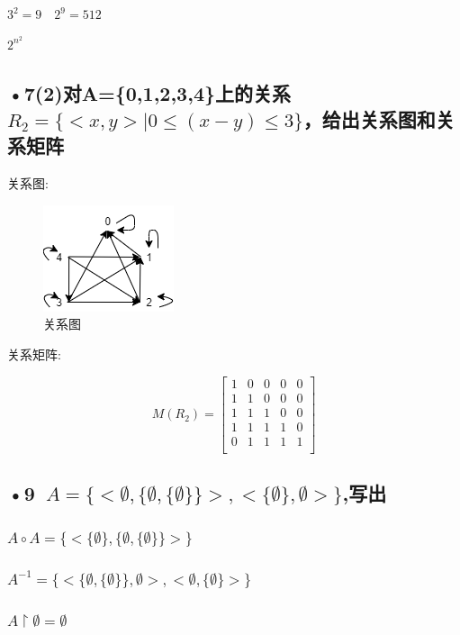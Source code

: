 \documentclass[UTF8]{ctexart}
\begin{document}
$3^2=9\quad 2^9=512$

$2^{n^2}$
\subsection*{•7(2)对A=\{0,1,2,3,4\}上的关系$R_2=\{<x,y>\mid 0\leqslant (x-y)\leqslant 3 \}$，给出关系图和关系矩阵}

关系图:
\begin{figure}[H]
  \centering
  \includegraphics[totalheight=2in]{HW7_4.png}
  \caption{关系图} \label{fig:graph}
\end{figure}

关系矩阵:

\begin{displaymath}
M(R_2)= \left[
\begin{matrix}
   1 & 0 & 0 &0 &0\\
   1 & 1 & 0 &0 &0\\
   1 & 1 & 1 &0 &0\\
   1 & 1 & 1 &1 &0\\
   0 & 1 & 1 &1 &1\\
\end{matrix}
\right] 
\end{displaymath}

\subsection*{•9\ $A=\{<\emptyset ,\{\emptyset , \{\emptyset\}\} >,<\{\emptyset \},\emptyset > \}$,写出}

\subsubsection*{$A\circ A =\{<\{\emptyset \},\{\emptyset , \{\emptyset\}\}>\}$}
\subsubsection*{$A^{-1}=\{<\{\emptyset , \{\emptyset\}\},\emptyset >,<\emptyset ,\{\emptyset \} > \} $}
\subsubsection*{$A\upharpoonright \emptyset =\emptyset $}
\end{document}
